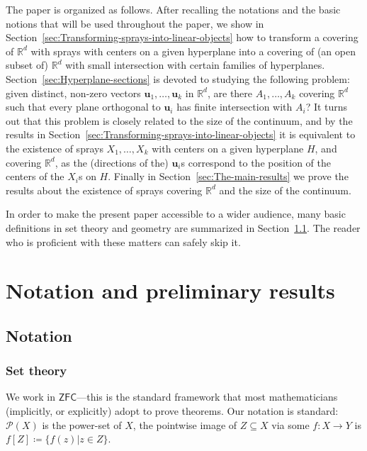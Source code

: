 \documentclass[12pt]{amsart}
\newcommand{\R}{\mathbb{R}}	%
\newcommand{\ZFC}{\mathsf{ZFC}}		%
\newcommand{\Pow}{\mathscr{P}}		%
\newcommand{\Mid}{\boldsymbol\mid}			%
\newcommand{\setof}[2]{\mathopen \{{#1}\Mid{#2} \mathclose\}} %
\theoremstyle{plain}
\theoremstyle{definition}
\theoremstyle{remark}
\begin{document}
The paper is organized as follows.
After recalling the notations and the basic notions that will be used throughout the paper, we show in Section~\ref{sec:Transforming-sprays-into-linear-objects} how to transform a covering of \( \R^d \) with sprays with centers on a given hyperplane into a covering of (an open subset of) \( \R^d \) with small intersection with certain families of hyperplanes.
Section~\ref{sec:Hyperplane-sections} is devoted to studying the following problem: given distinct, non-zero vectors \( \mathbf{u}_1 , \dots , \mathbf{u}_k \) in \( \R^d \), are there \( A_1 , \dots , A_k \) covering \( \R^d \) such that every plane orthogonal to \( \mathbf{u}_i \) has finite intersection with \( A_i \)? 
It turns out that this problem is closely related to the size of the continuum, and by the results in Section~\ref{sec:Transforming-sprays-into-linear-objects} it is equivalent to the existence of sprays \( X_1 , \dots , X_k \) with centers on a given hyperplane \( H \), and covering \( \R^d \), as the (directions of the) \( \mathbf{u}_i \)s correspond to the position of the centers of the \( X_i \)s on \( H \).
Finally in Section~\ref{sec:The-main-results} we prove the results about the existence of sprays covering \( \R^d \) and the size of the continuum.

In order to make the present paper accessible to a wider audience, many basic definitions in set theory and geometry are summarized in Section~\ref{subsec:Notation}.
The reader who is proficient with these matters can safely skip it.

\section{Notation and preliminary results}\label{sec:Notation-and-preliminary-results}
\subsection{Notation}\label{subsec:Notation}

\subsubsection{Set theory}
We work in \( \ZFC \)---this is the standard framework that most mathematicians (implicitly, or explicitly) adopt to prove theorems.
Our notation is standard: \( \Pow ( X ) \) is the power-set of \( X \), the pointwise image of \( Z \subseteq X \) via some \( f \colon X \to Y \) is \( f [ Z ] \coloneqq \setof{ f ( z ) }{ z \in Z } \).
\end{document}
